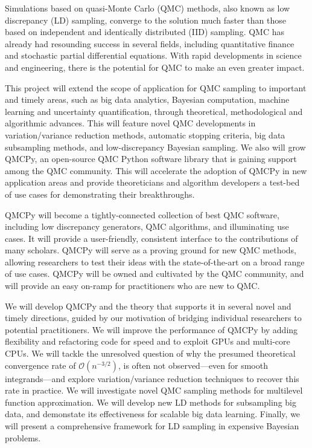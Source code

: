 \documentclass[11pt]{article}%
\begin{document}

\noindent Simulations based on quasi-Monte Carlo (QMC) methods, also known as low discrepancy (LD) sampling, converge to the solution much faster than those based on independent and identically distributed (IID) sampling.  QMC has already had resounding success in several fields, including quantitative finance and stochastic partial differential equations. With rapid developments in science and engineering, there is the potential for QMC to make an even greater impact.

This project will extend the scope of application for QMC sampling to important and timely areas, such as big data analytics, Bayesian computation, machine learning and uncertainty quantification, through theoretical, methodological and algorithmic advances. This will feature novel QMC developments in variation/variance reduction methods, automatic stopping criteria, big data subsampling methods, and low-discrepancy Bayesian sampling. We also will grow QMCPy, an open-source QMC Python software library that is gaining support among the QMC community. This will accelerate the adoption of QMCPy in new application areas and provide theoreticians and algorithm developers a test-bed of use cases for demonstrating their breakthroughs.

QMCPy will become a tightly-connected collection of best QMC software, including low discrepancy generators, QMC algorithms, and illuminating use cases. It will provide a user-friendly, consistent interface to the contributions of many scholars. QMCPy will serve as a proving ground for new QMC methods, allowing researchers to test their ideas with the state-of-the-art on a broad range of use cases. QMCPy will be owned and cultivated by the QMC community, and will provide an easy on-ramp for practitioners who are new to QMC.

\bigskip


\noindent We will develop QMCPy and the theory that supports it in several novel and timely directions, guided by our motivation of bridging individual researchers to potential practitioners. We will improve the performance of QMCPy by adding flexibility and refactoring code for speed and to exploit GPUs and multi-core CPUs.  We will tackle the unresolved question of why the presumed theoretical convergence rate of $\mathcal{O}(n^{-3/2})$, is often not observed---even for smooth integrands---and explore variation/variance reduction techniques to recover this rate in practice. We will investigate novel QMC sampling methods for multilevel function approximation. We will develop new LD methods for subsampling big data, and demonstate its effectiveness for scalable big data learning. Finally, we will present a comprehensive framework for LD sampling in expensive Bayesian problems.
\end{document}
